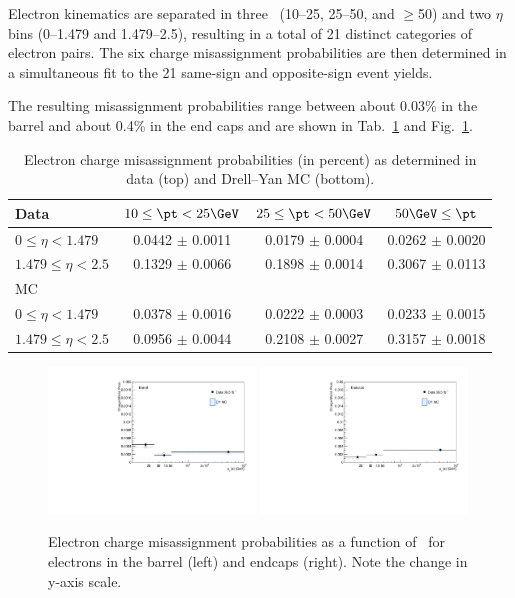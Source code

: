 Electron kinematics are separated in three \pt\ (10--25\GeV, 25--50\GeV, and $\geq$50\GeV) and two $\eta$ bins (0--1.479 and 1.479--2.5), resulting in a total of 21 distinct categories of electron pairs.
The six charge misassignment probabilities are then determined in a simultaneous fit to the 21 same-sign and opposite-sign event yields.

The resulting misassignment probabilities range between about 0.03\% in the barrel and about 0.4\% in the end caps and are shown in Tab.~\ref{tab:chmisid_prob} and Fig.~\ref{fig:chmisid_prob}.

\begin{table}[htp]
\centering
\caption{
	Electron charge misassignment probabilities (in percent) as determined in data (top) and Drell--Yan MC (bottom).
}
\label{tab:chmisid_prob}
\begin{tabular}{lccc}
	\hline
	  Data                & $10\leq\pt<25\GeV$ & $25\leq\pt<50\GeV$ & $50\GeV\leq\pt$ \\
	\hline
	 $0\leq\eta<1.479$    & 0.0442 $\pm$ 0.0011 & 0.0179 $\pm$ 0.0004 & 0.0262 $\pm$ 0.0020 \\
	 $1.479\leq\eta<2.5$  & 0.1329 $\pm$ 0.0066 & 0.1898 $\pm$ 0.0014 & 0.3067 $\pm$ 0.0113 \\
	\hline
	\hline
	  MC                  &  &  & \\
	\hline
	 $0\leq\eta<1.479$    & 0.0378 $\pm$ 0.0016 & 0.0222 $\pm$ 0.0003 & 0.0233 $\pm$ 0.0015 \\
	 $1.479\leq\eta<2.5$  & 0.0956 $\pm$ 0.0044 & 0.2108 $\pm$ 0.0027 & 0.3157 $\pm$ 0.0018 \\
	\hline
\end{tabular}
\end{table}


\begin{figure}[htp]
	\centering
	\includegraphics[width=0.49\textwidth]{plots_leptons/chargeflip/chmid_prob_barrel.pdf}
	\includegraphics[width=0.49\textwidth]{plots_leptons/chargeflip/chmid_prob_endcap.pdf}
	\caption{
	Electron charge misassignment probabilities as a function of \pt\ for electrons in the barrel (left) and endcaps (right). Note the change in y-axis scale.
	}
	\label{fig:chmisid_prob}
\end{figure}


